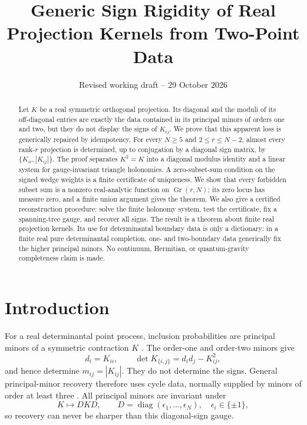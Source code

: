 \documentclass[11pt,a4paper]{article}
\title{\textbf{Generic Sign Rigidity of Real Projection Kernels from Two-Point Data}}
\author{}
\date{Revised working draft -- 29 October 2026}
\theoremstyle{definition}
\theoremstyle{remark}
\newcommand{\Gr}{\operatorname{Gr}}
\newcommand{\diag}{\operatorname{diag}}
\begin{document}
\maketitle

\begin{abstract}
Let $K$ be a real symmetric orthogonal projection. Its diagonal and the moduli of its
off-diagonal entries are exactly the data contained in its principal minors of orders one
and two, but they do not display the signs of $K_{ij}$.  We prove that this apparent loss is
generically repaired by idempotency.  For every $N\ge5$ and $2\le r\le N-2$, almost every
rank-$r$ projection is determined, up to conjugation by a diagonal sign matrix, by
$\{K_{ii},|K_{ij}|\}$.  The proof separates $K^2=K$ into a diagonal modulus identity and a
linear system for gauge-invariant triangle holonomies.  A zero-subset-sum condition on the
signed wedge weights is a finite certificate of uniqueness.  We show that every forbidden
subset sum is a nonzero real-analytic function on $\Gr(r,N)$; its zero locus has measure
zero, and a finite union argument gives the theorem.  We also give a certified reconstruction
procedure: solve the finite holonomy system, test the certificate, fix a spanning-tree gauge,
and recover all signs.  The result is a theorem about finite real projection kernels.  Its
use for determinantal boundary data is only a dictionary: in a finite real pure
determinantal completion, one- and two-boundary data generically fix the higher principal
minors.  No continuum, Hermitian, or quantum-gravity completeness claim is made.
\end{abstract}

\section{Introduction}

For a real determinantal point process, inclusion probabilities are principal minors of a
symmetric contraction $K$ \citep{HKPV2006,KuleszaTaskar2012}.  The order-one and order-two
minors give
\begin{equation}
 d_i=K_{ii},\qquad \det K_{\{i,j\}}=d_id_j-K_{ij}^2,
 \label{eq:minors}
\end{equation}
and hence determine $m_{ij}=|K_{ij}|$.  They do not determine the signs.  General
principal-minor recovery therefore uses cycle data, normally supplied by minors of order at
least three \citep{UrschelEtAl2017,Brunel2018,BrunelUrschel2024}.  All principal minors are
invariant under
\begin{equation}
 K\longmapsto D K D,\qquad D=\diag(\epsilon_1,\ldots,\epsilon_N),\quad
 \epsilon_i\in\{\pm1\},
 \label{eq:gauge}
\end{equation}
so recovery can never be sharper than this diagonal-sign gauge.
\end{document}
